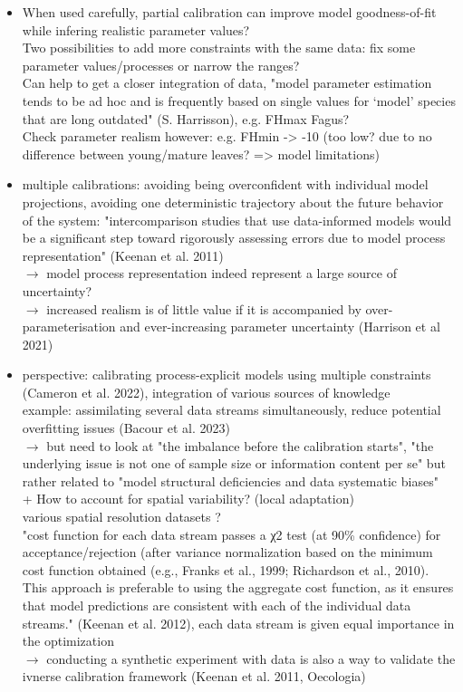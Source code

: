 \documentclass[letterpaper,8pt]{extarticle}  %
\begin{document}
\begin{doublespacing}
\begin{linenumbers}
\begin{itemize}
\item When used carefully, partial calibration can improve model goodness-of-fit while infering realistic parameter values? \\
Two possibilities to add more constraints with the same data: fix some parameter values/processes or narrow the ranges? \\
Can help to get a closer integration of data, "model parameter estimation tends to be ad hoc and is frequently based on single values for ‘model’ species that are long outdated" (S. Harrisson), e.g. FHmax Fagus?\\
Check parameter realism however: e.g. FHmin -> -10 (too low? due to no difference between young/mature leaves? => model limitations)

\item multiple calibrations: avoiding being overconfident with individual model projections, avoiding one deterministic trajectory about the future behavior of the system: "intercomparison studies that use data-informed models would be a significant step toward rigorously assessing errors due to model process representation" (Keenan et al. 2011) \\
$\rightarrow$ model process representation indeed represent a large source of uncertainty?\\
$\rightarrow$ increased realism is of little value if it is accompanied by over-parameterisation and ever-increasing parameter uncertainty (Harrison et al 2021) \\

\item perspective: calibrating process-explicit models using multiple constraints (Cameron et al. 2022), integration of various sources of knowledge \\
example: assimilating several data streams simultaneously, reduce potential overfitting issues (Bacour et al. 2023)\\
 $\rightarrow$ but need to look at "the imbalance before the calibration starts", "the underlying issue is not one of sample size or information content per se" but rather related to "model structural deficiencies and data systematic biases"\\
 + How to  account for spatial variability? (local adaptation)\\
 various spatial resolution datasets ? \\
 "cost function for each data stream passes a χ2 test (at 90\% confidence) for acceptance/rejection (after variance normalization based on the minimum cost function obtained (e.g., Franks et al., 1999; Richardson et al., 2010). This approach is preferable to using the aggregate cost function, as it ensures that model predictions are consistent with each of the individual data streams." (Keenan et al. 2012), each data stream is given equal importance in the optimization \\
 $\rightarrow$ conducting a synthetic experiment with data is also a way to validate the ivnerse calibration framework (Keenan et al. 2011, Oecologia)


\end{itemize}
\end{linenumbers}
\end{doublespacing}
\end{document}
